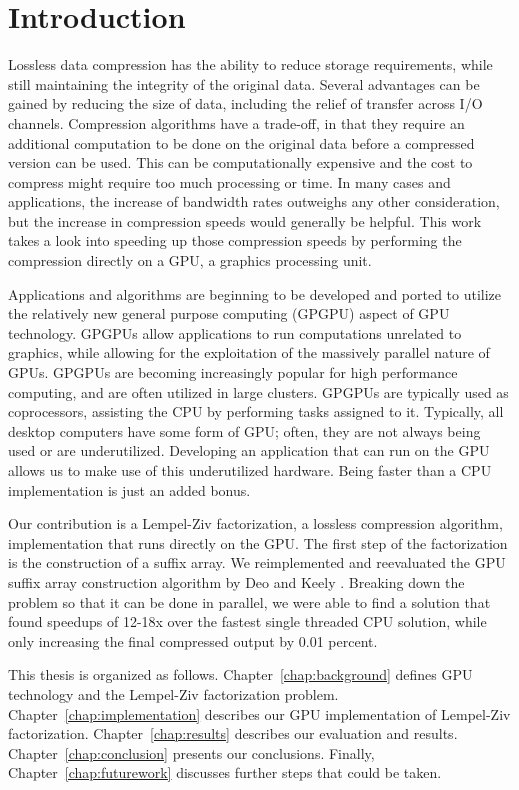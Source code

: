 \chapter{Introduction}
Lossless data compression has the ability to reduce storage requirements, while still maintaining the integrity of the original data.
Several advantages can be gained by reducing the size of data, including the relief of transfer across I/O channels.
Compression algorithms have a trade-off, in that they require an additional computation to be done on the original data before a compressed version can be used.
This can be computationally expensive and the cost to compress might require too much processing or time.
In many cases and applications, the increase of bandwidth rates outweighs any other consideration, but the increase in compression speeds would generally be helpful.
This work takes a look into speeding up those compression speeds by performing the compression directly on a GPU, a graphics processing unit.

Applications and algorithms are beginning to be developed and ported to utilize the relatively new general purpose computing (GPGPU) aspect of GPU technology.
GPGPUs allow applications to run computations unrelated to graphics, while allowing for the exploitation of the massively parallel nature of GPUs.
GPGPUs are becoming increasingly popular for high performance computing, and are often utilized in large clusters.
GPGPUs are typically used as coprocessors, assisting the CPU by performing tasks assigned to it.
Typically, all desktop computers have some form of GPU; often, they are not always being used or are underutilized.
Developing an application that can run on the GPU allows us to make use of this underutilized hardware.
Being faster than a CPU implementation is just an added bonus.


Our contribution is a Lempel-Ziv factorization, a lossless compression algorithm, implementation that runs directly on the GPU.
The first step of the factorization is the construction of a suffix array.
We reimplemented and reevaluated the GPU suffix array construction algorithm by Deo and Keely \cite{Deo}.
Breaking down the problem so that it can be done in parallel, we were able to find a solution that found speedups of 12-18x over the fastest single threaded CPU solution, while only increasing the final compressed output by 0.01 percent.

This thesis is organized as follows.
Chapter~\ref{chap:background} defines GPU technology and the Lempel-Ziv factorization problem.
Chapter~\ref{chap:implementation} describes our GPU implementation of Lempel-Ziv factorization.
Chapter~\ref{chap:results} describes our evaluation and results.
Chapter~\ref{chap:conclusion} presents our conclusions.
Finally, Chapter~\ref{chap:futurework} discusses further steps that could be taken.
